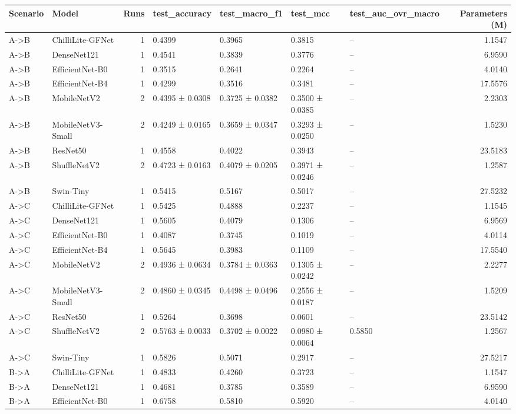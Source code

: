 \begin{tabular}{llrllllr}
\toprule
Scenario & Model & Runs & test\_accuracy & test\_macro\_f1 & test\_mcc & test\_auc\_ovr\_macro & Parameters (M) \\
\midrule
A->B & ChilliLite-GFNet & 1 & 0.4399 & 0.3965 & 0.3815 & -- & 1.1547 \\
A->B & DenseNet121 & 1 & 0.4541 & 0.3839 & 0.3776 & -- & 6.9590 \\
A->B & EfficientNet-B0 & 1 & 0.3515 & 0.2641 & 0.2264 & -- & 4.0140 \\
A->B & EfficientNet-B4 & 1 & 0.4299 & 0.3516 & 0.3481 & -- & 17.5576 \\
A->B & MobileNetV2 & 2 & 0.4395 ± 0.0308 & 0.3725 ± 0.0382 & 0.3500 ± 0.0385 & -- & 2.2303 \\
A->B & MobileNetV3-Small & 2 & 0.4249 ± 0.0165 & 0.3659 ± 0.0347 & 0.3293 ± 0.0250 & -- & 1.5230 \\
A->B & ResNet50 & 1 & 0.4558 & 0.4022 & 0.3943 & -- & 23.5183 \\
A->B & ShuffleNetV2 & 2 & 0.4723 ± 0.0163 & 0.4079 ± 0.0205 & 0.3971 ± 0.0246 & -- & 1.2587 \\
A->B & Swin-Tiny & 1 & 0.5415 & 0.5167 & 0.5017 & -- & 27.5232 \\
A->C & ChilliLite-GFNet & 1 & 0.5425 & 0.4888 & 0.2237 & -- & 1.1545 \\
A->C & DenseNet121 & 1 & 0.5605 & 0.4079 & 0.1306 & -- & 6.9569 \\
A->C & EfficientNet-B0 & 1 & 0.4087 & 0.3745 & 0.1019 & -- & 4.0114 \\
A->C & EfficientNet-B4 & 1 & 0.5645 & 0.3983 & 0.1109 & -- & 17.5540 \\
A->C & MobileNetV2 & 2 & 0.4936 ± 0.0634 & 0.3784 ± 0.0363 & 0.1305 ± 0.0242 & -- & 2.2277 \\
A->C & MobileNetV3-Small & 2 & 0.4860 ± 0.0345 & 0.4498 ± 0.0496 & 0.2556 ± 0.0187 & -- & 1.5209 \\
A->C & ResNet50 & 1 & 0.5264 & 0.3698 & 0.0601 & -- & 23.5142 \\
A->C & ShuffleNetV2 & 2 & 0.5763 ± 0.0033 & 0.3702 ± 0.0022 & 0.0980 ± 0.0064 & 0.5850 & 1.2567 \\
A->C & Swin-Tiny & 1 & 0.5826 & 0.5071 & 0.2917 & -- & 27.5217 \\
B->A & ChilliLite-GFNet & 1 & 0.4833 & 0.4260 & 0.3723 & -- & 1.1547 \\
B->A & DenseNet121 & 1 & 0.4681 & 0.3785 & 0.3589 & -- & 6.9590 \\
B->A & EfficientNet-B0 & 1 & 0.6758 & 0.5810 & 0.5920 & -- & 4.0140 \\

\end{tabular}
